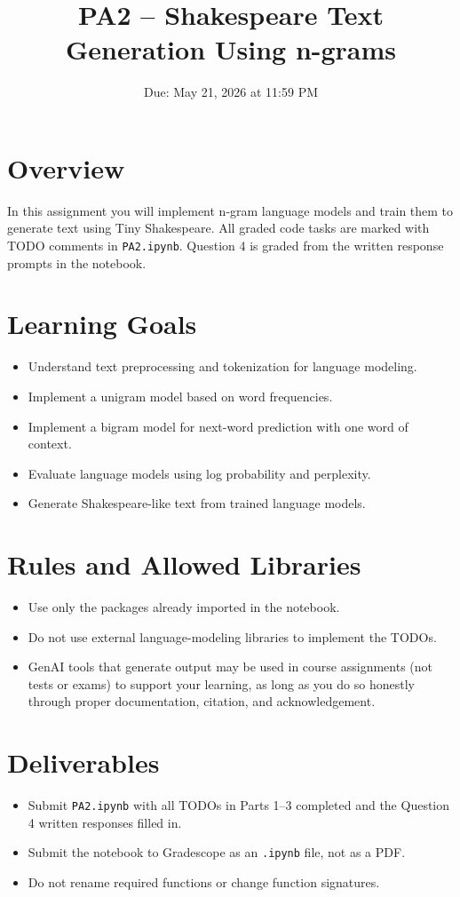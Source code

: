 \documentclass[11pt]{article}
\title{PA2 -- Shakespeare Text Generation Using n-grams}
\date{Due: May 21, 2026 at 11:59 PM}
\begin{document}
\maketitle

\section*{Overview}
In this assignment you will implement n-gram language models and train them to
generate text using Tiny Shakespeare. All graded code tasks are marked with
TODO comments in \texttt{PA2.ipynb}. Question 4 is graded from the written
response prompts in the notebook.

\section*{Learning Goals}
\begin{itemize}
  \item Understand text preprocessing and tokenization for language modeling.
  \item Implement a unigram model based on word frequencies.
  \item Implement a bigram model for next-word prediction with one word of context.
  \item Evaluate language models using log probability and perplexity.
  \item Generate Shakespeare-like text from trained language models.
\end{itemize}

\section*{Rules and Allowed Libraries}
\begin{itemize}
  \item Use only the packages already imported in the notebook.
  \item Do not use external language-modeling libraries to implement the TODOs.
  \item GenAI tools that generate output may be used in course assignments (not tests or exams) to support your learning, as long as you do so honestly through proper documentation, citation, and acknowledgement.
\end{itemize}

\section*{Deliverables}
\begin{itemize}
  \item Submit \texttt{PA2.ipynb} with all TODOs in Parts 1--3 completed and the Question 4 written responses filled in.
  \item Submit the notebook to Gradescope as an \texttt{.ipynb} file, not as a PDF.
  \item Do not rename required functions or change function signatures.
\end{itemize}
\end{document}
